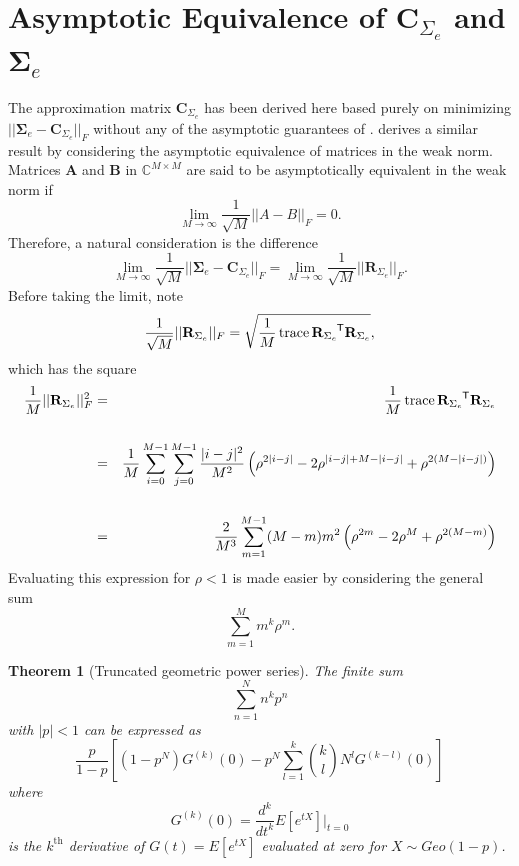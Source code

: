 \documentclass[letterpaper,12pt,oneside,final]{article}
\newtheorem{theorem}{Theorem}
\newcommand{\m}[1]{\mathbf{#1}}               %
\newcommand{\sm}[1]{\boldsymbol{#1}}   %
\newcommand{\tr}[1]{{#1}^{\mkern-1.5mu\mathsf{T}}}              %
\newcommand{\norm}[1]{||{#1}||}              %
\newcommand{\frob}[1]{\norm{#1}_F}
\newcommand{\abs}[1]{\lvert{#1}\rvert}              %
\newcommand*{\trace}{\operatorname{trace}}
\newcommand{\field}[1]{\mathbb{#1}}
\newcommand{\Complex}{\field{C}}
\begin{document}
\section{Asymptotic Equivalence of $\m{C}_{\Sigma_e}$ and $\m{\Sigma}_e$} \label{c:multipleTesting:asympEquiv}

The approximation matrix $\m{C}_{\Sigma_e}$ has been derived here based purely on minimizing $\frob{\sm{\Sigma}_e - \m{C}_{\Sigma_e}}$ without any of the asymptotic guarantees of \cite{grenanderszego1958}. \cite{gray2006toeplitz} derives a similar result by considering the asymptotic equivalence of matrices in the weak norm. Matrices $\m{A}$ and $\m{B}$ in $\Complex^{M \times M}$ are said to be asymptotically equivalent in the weak norm if
$$\lim_{M \rightarrow \infty} \frac{1}{\sqrt{M}} \frob{A - B} = 0.$$
Therefore, a natural consideration is the difference
\begin{equation} \label{eq:multipleTesting:asympEq}
  \lim_{M \rightarrow \infty} \frac{1}{\sqrt{M}} \frob{\sm{\Sigma}_e - \m{C}_{\Sigma_e}} = \lim_{M \rightarrow \infty} \frac{1}{\sqrt{M}} \frob{\m{R}_{\Sigma_e}}.
\end{equation}
Before taking the limit, note
$$\frac{1}{\sqrt{M}} \frob{\m{R}_{\Sigma_e}} =  \sqrt{ \frac{1}{M} \trace{\tr{\m{R}_{\Sigma_e}} \m{R}_{\Sigma_e}} },$$
which has the square
\begin{eqnarray}
    \frac{1}{M} \frob{\m{R}_{\Sigma_e}}^2 & = &  \frac{1}{M} \trace{\tr{\m{R}_{\Sigma_e}} \m{R}_{\Sigma_e}} \nonumber \\
    & & \nonumber \\
    & = & \frac{1}{M} \sum_{i = 0}^{M-1} \sum_{j = 0}^{M-1} \frac{\abs{i-j}^2}{M^2} \left ( \rho^{2\abs{i-j}} - 2 \rho^{\abs{i-j} + M - \abs{i-j}} + \rho^{2(M - \abs{i-j})} \right ) \nonumber \\
    & & \nonumber \\
    & = & \frac{2}{M^3} \sum_{m = 1}^{M-1} (M-m) m^2 \left ( \rho^{2m} - 2 \rho^{M} + \rho^{2(M - m)} \right ) \label{eq:asymTrace}
\end{eqnarray}
Evaluating this expression for $\rho < 1$ is made easier by considering the general sum
$$\sum_{m = 1}^{M} m^k \rho^m.$$
\begin{theorem}[Truncated geometric power series] \label{thm:trunkmoment}
  The finite sum
  $$\sum_{n = 1}^{N} n^k p^n$$
  with $\abs{p} < 1$ can be expressed as
  $$\frac{p}{1 - p} \left [ (1 - p^N) G^{(k)}(0) - p^{N} \sum_{l = 1}^k {k \choose l} N^l G^{(k-l)}(0) \right ]$$
  where
  $$G^{(k)}(0) = \frac{d^k}{dt^k} E[e^{tX}] \Big |_{t = 0}$$
  is the $k^{\text{th}}$ derivative of $G(t) = E[e^{tX}]$ evaluated at zero for $X \sim Geo(1 - p)$.
\end{theorem}
\end{document}
